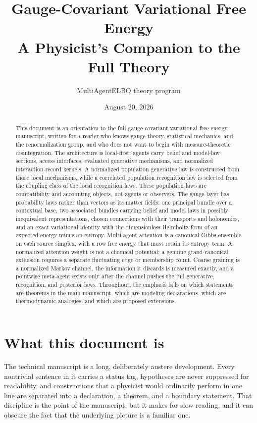 \documentclass[11pt,letterpaper]{article}
\title{\textbf{Gauge-Covariant Variational Free Energy}\\[0.35em]
\Large A Physicist's Companion to the Full Theory}
\author{MultiAgentELBO theory program}
\date{August 20, 2026}
\begin{document}
\maketitle

\begin{abstract}
This document is an orientation to the full gauge-covariant variational free energy manuscript, written for a reader who knows gauge theory, statistical mechanics, and the renormalization group, and who does not want to begin with measure-theoretic disintegration. The architecture is local-first: agents carry belief and model-law sections, access interfaces, evaluated generative mechanisms, and normalized interaction-record kernels. A normalized population generative law is constructed from those local mechanisms, while a correlated population recognition law is selected from the coupling class of the local recognition laws. These population laws are compatibility and accounting objects, not agents or observers. The gauge layer has probability laws rather than vectors as its matter fields: one principal bundle over a contextual base, two associated bundles carrying belief and model laws in possibly inequivalent representations, chosen connections with their transports and holonomies, and an exact variational identity with the dimensionless Helmholtz form of an expected energy minus an entropy. Multi-agent attention is a canonical Gibbs ensemble on each source simplex, with a row free energy that must retain its entropy term. A normalized attention weight is not a chemical potential; a genuine grand-canonical extension requires a separate fluctuating edge or membership count. Coarse graining is a normalized Markov channel, the information it discards is measured exactly, and a pointwise meta-agent exists only after the channel pushes the full generative, recognition, and posterior laws. Throughout, the emphasis falls on which statements are theorems in the main manuscript, which are modeling declarations, which are thermodynamic analogies, and which are proposed extensions.
\end{abstract}

\tableofcontents
\newpage

\section{What this document is}

The technical manuscript is a long, deliberately austere development. Every nontrivial sentence in it carries a status tag, hypotheses are never suppressed for readability, and constructions that a physicist would ordinarily perform in one line are separated into a declaration, a theorem, and a boundary statement. That discipline is the point of the manuscript, but it makes for slow reading, and it can obscure the fact that the underlying picture is a familiar one.
\end{document}
